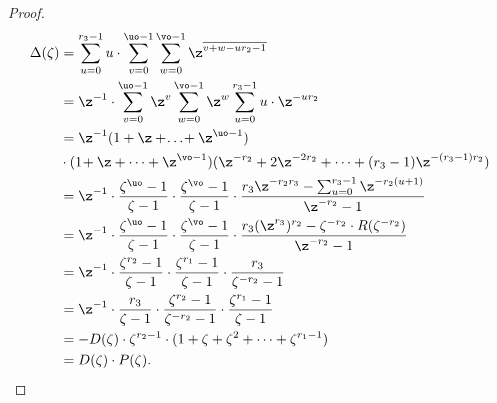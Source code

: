 \begin{proof}
\begin{equation*}
\begin{split}
\Delta(\zeta)&=
\sum_{u=0}^{r_3-1}u\cdot\sum_{v=0}^{\uo-1} \sum _{w=0}^{\vo-1} \z^{\overline{v+w-ur_2-1}}\\
&=\z^{-1}\cdot\sum_{v=0}^{\uo-1}\z^v \sum _{w=0}^{\vo-1} \z^{w}\sum_{u=0}^{r_3-1}u\cdot\z^{-ur_2}\\
&=\z^{-1}(1+\z+\!\dots\!+\z^{\uo-1})\\
&\cdot(1\!+\z+\dots+\z^{\vo-1})(\z^{-r_2}+2\z^{-2r_2}+\dots+(r_3-1)\z^{-(r_3-1)r_2})\\
&=\z^{-1} \cdot \frac{\zeta^{\uo}-1}{\zeta-1}\cdot \frac{\zeta^{\vo}-1}{\zeta-1}\cdot \frac{r_3\z^{-r_2r_3}-\sum_{u=0}^{r_3-1}\z^{-r_2(u+1)}}{\z^{-r_2}-1}
\\
&=\z^{-1} \cdot \frac{\zeta^{\uo}-1}{\zeta-1}\cdot \frac{\zeta^{\vo}-1}{\zeta-1}\cdot \frac{r_3(\z^{r_3})^{r_2}-\zeta^{-r_2}\cdot R(\zeta^{-r_2})}{\z^{-r_2}-1}
\\
&=\z^{-1}\cdot\frac{\zeta^{r_2}-1}{\zeta-1}\cdot \frac{\zeta^{r_1}-1}{\zeta-1} \cdot \frac{r_3}{\zeta^{-r_2}-1}\\
&=\z^{-1}\cdot\frac{r_3}{\zeta-1}\cdot \frac{\zeta^{r_2}-1}{\zeta^{-r_2}-1}\cdot \frac{\zeta^{r_1}-1}{\zeta-1}\\
&=-D(\zeta)\cdot \zeta^{r_2-1}\cdot (1+\zeta+\zeta^2+\dots+\zeta^{r_1-1})\\
&=D(\zeta)\cdot P(\zeta).
\end{split}
\end{equation*}
\end{proof}

